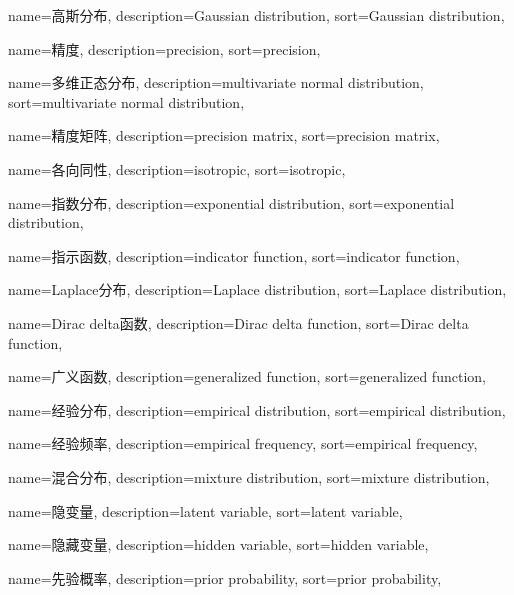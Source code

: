 {
  name=高斯分布,
  description={Gaussian distribution},
  sort={Gaussian distribution},
}

{
  name=精度,
  description={precision},
  sort={precision},
}

{
  name=多维正态分布,
  description={multivariate normal distribution},
  sort={multivariate normal distribution},
}

{
  name=精度矩阵,
  description={precision matrix},
  sort={precision matrix},
}

{
  name=各向同性,
  description={isotropic},
  sort={isotropic},
}

{
  name=指数分布,
  description={exponential distribution},
  sort={exponential distribution},
}

{
  name=指示函数,
  description={indicator function},
  sort={indicator function},
}

{
  name=Laplace分布,
  description={Laplace distribution},
  sort={Laplace distribution},
}

{
  name=Dirac delta函数,
  description={Dirac delta function},
  sort={Dirac delta function},
}

{
  name=广义函数,
  description={generalized function},
  sort={generalized function},
}

{
  name=经验分布,
  description={empirical distribution},
  sort={empirical distribution},
}

{
  name=经验频率,
  description={empirical frequency},
  sort={empirical frequency},
}

{
  name=混合分布,
  description={mixture distribution},
  sort={mixture distribution},
}

{
  name=隐变量,
  description={latent variable},
  sort={latent variable},
}

{
  name=隐藏变量,
  description={hidden variable},
  sort={hidden variable},
}

{
  name=先验概率,
  description={prior probability},
  sort={prior probability},
}

